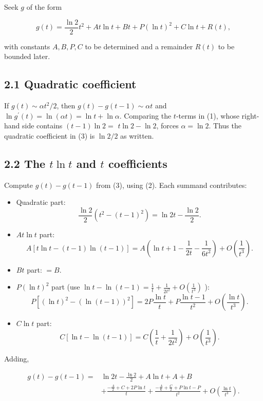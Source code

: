 \documentclass[10pt]{article}
\begin{document}
Seek $g$ of the form


\begin{equation*}
g(t)=\frac{\ln 2}{2} t^{2}+A t \ln t+B t+P(\ln t)^{2}+C \ln t+R(t), \tag{3}
\end{equation*}


with constants $A, B, P, C$ to be determined and a remainder $R(t)$ to be bounded later.

\subsection*{2.1 Quadratic coefficient}
If $g(t) \sim \alpha t^{2} / 2$, then $g(t)-g(t-1) \sim \alpha t$ and $\ln g^{\prime}(t)=\ln (\alpha t)=\ln t+\ln \alpha$. Comparing the $t$-terms in (1), whose right-hand side contains $(t-1) \ln 2=$ $t \ln 2-\ln 2$, forces $\alpha=\ln 2$. Thus the quadratic coefficient in (3) is $\ln 2 / 2$ as written.

\subsection*{2.2 The $t \ln t$ and $t$ coefficients}
Compute $g(t)-g(t-1)$ from (3), using (2). Each summand contributes:

\begin{itemize}
  \item[-] Quadratic part:
$$
\frac{\ln 2}{2}\left(t^{2}-(t-1)^{2}\right)=\ln 2 t-\frac{\ln 2}{2} .
$$
  \item[-] $A t \ln t$ part:
$$
A[t \ln t-(t-1) \ln (t-1)]=A\left(\ln t+1-\frac{1}{2 t}-\frac{1}{6 t^{2}}\right)+O\left(\frac{1}{t^{3}}\right) .
$$
  \item[-] $B t$ part: $=B$.
  \item[-] $P(\ln t)^{2}$ part (use $\ln t-\ln (t-1)=\frac{1}{t}+\frac{1}{2 t^{2}}+O\left(\frac{1}{t^{3}}\right)$ ):
$$
P\left[(\ln t)^{2}-(\ln (t-1))^{2}\right]=2 P \frac{\ln t}{t}+P \frac{\ln t-1}{t^{2}}+O\left(\frac{\ln t}{t^{3}}\right) .
$$
  \item[-] $C \ln t$ part:
$$
C[\ln t-\ln (t-1)]=C\left(\frac{1}{t}+\frac{1}{2 t^{2}}\right)+O\left(\frac{1}{t^{3}}\right) .
$$
\end{itemize}

Adding,


\begin{align*}
g(t)-g(t-1)= & \ln 2 t-\frac{\ln 2}{2}+A \ln t+A+B \\
& +\frac{-\frac{A}{2}+C+2 P \ln t}{t}+\frac{-\frac{A}{6}+\frac{C}{2}+P \ln t-P}{t^{2}}+O\left(\frac{\ln t}{t^{3}}\right) . \tag{4}
\end{align*}
\end{document}

